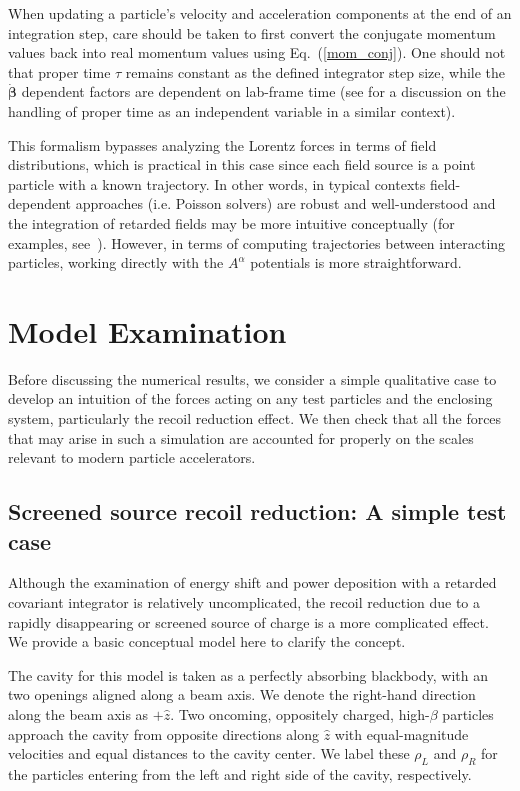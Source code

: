 \documentclass[reprint,
               amsmath,amssymb,nofootinbib, aps%
              ]{revtex4-2}
\begin{document}
When updating a particle's velocity and acceleration components at the end of an integration step, care should be taken to first convert the conjugate momentum values back into real momentum values using Eq.~(\ref{mom_conj}). One should not that proper time $\tau$ remains constant as the defined integrator step size, while the $\boldsymbol{\dot{\beta}}$ dependent factors are dependent on lab-frame time (see \cite{laface_2020_covariant} for a discussion on the handling of proper time as an independent variable in a similar context).

This formalism bypasses analyzing the Lorentz forces in terms of field distributions, which is practical in this case since each field source is a point particle with a known trajectory. In other words, in typical contexts field-dependent approaches (i.e. Poisson solvers) are robust and well-understood and the integration of retarded fields may be more intuitive conceptually (for examples, see~\cite{Ryne:IPAC2018-THPAK044,ryne:ipac12-tuppp036,quattromini_LW_2009}). However, in terms of computing trajectories between interacting particles, working directly with the $A^{\alpha}$ potentials is more straightforward.

\section{Model Examination}\label{model_verification}
Before discussing the numerical results, we consider a simple qualitative case to develop an intuition of the forces acting on any test particles and the enclosing system, particularly the recoil reduction effect. We then check that all the forces that may arise in such a simulation are accounted for properly on the scales relevant to modern particle accelerators. 

\subsection{Screened source recoil reduction: A simple test case }\label{sec:recoil_reduct_pedagog}
\vspace{-0.2cm}
Although the examination of energy shift and power deposition with a retarded covariant integrator is relatively uncomplicated, the recoil reduction due to a rapidly disappearing or screened source of charge is a more complicated effect. We provide a basic conceptual model here to clarify the concept.

The cavity for this model is taken as a perfectly absorbing blackbody, with an two openings aligned along a beam axis. We denote the right-hand direction along the beam axis as $+\hat{z}$.
Two oncoming, oppositely charged, high-$\beta$ particles approach the cavity from opposite directions along $\hat{z}$ with equal-magnitude velocities and equal distances to the cavity center. We label these $\rho_L$ and $\rho_{R}$ for the particles entering from the left and right side of the cavity, respectively.
\end{document}

